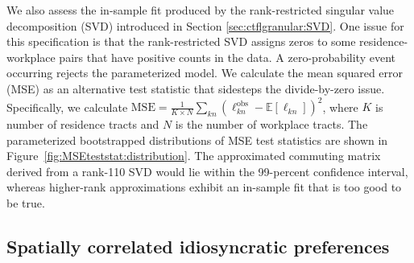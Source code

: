\documentclass[11pt]{article}
\theoremstyle{definition}
\begin{document}
We also assess the in-sample fit produced by the rank-restricted singular value decomposition (SVD) introduced in Section \ref{sec:ctflgranular:SVD}.
One issue for this specification is that the rank-restricted SVD assigns zeros to some residence-workplace pairs that have positive counts in the data.
A zero-probability event occurring rejects the parameterized model. 
We calculate the mean squared error (MSE) as an alternative test statistic that sidesteps the divide-by-zero issue.
Specifically, we calculate $\text{MSE}= \frac{1}{K \times N} \sum_{kn} (\ell_{kn}^{\text{obs}} - \mathbb{E}[\ell_{kn}])^2$,
where $K$ is number of residence tracts and $N$ is the number of workplace tracts.
The parameterized bootstrapped distributions of MSE test statistics are shown in Figure~\ref{fig:MSEteststat:distribution}.
The approximated commuting matrix derived from a rank-110 SVD 
would lie within the 99-percent confidence interval,
whereas higher-rank approximations exhibit an in-sample fit that is too good to be true.
\FloatBarrier
\subsection{Spatially correlated idiosyncratic preferences}\label{sec:appendix:nestedlogit}
\end{document}
